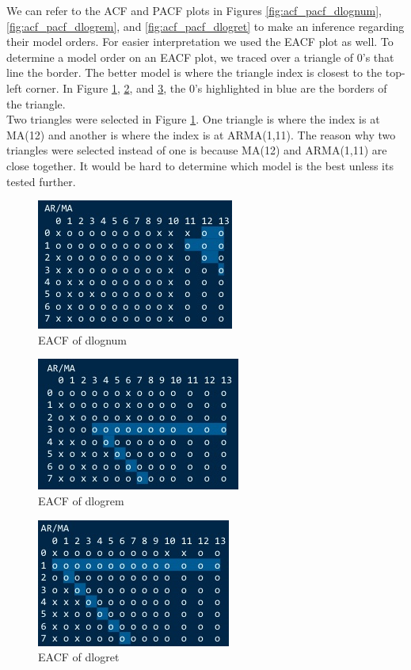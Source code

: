 \documentclass[a4paper]{article}
\begin{document}
We can refer to the ACF and PACF plots in Figures \ref{fig:acf_pacf_dlognum}, \ref{fig:acf_pacf_dlogrem}, and \ref{fig:acf_pacf_dlogret} to make an inference regarding their model orders. For easier interpretation we used the EACF plot as well. To determine a model order on an EACF plot, we traced over a triangle of 0's that line the border. The better model is where the triangle index is closest to the top-left corner. In Figure \ref{fig:eacf_num}, \ref{fig:eacf_rem}, and \ref{fig:eacf_ret}, the 0's highlighted in blue are the borders of the triangle. \\

Two triangles were selected in Figure \ref{fig:eacf_num}. One triangle is where the index is at MA(12) and another is where the index is at ARMA(1,11). The reason why two triangles were selected instead of one is because MA(12) and ARMA(1,11) are close together. It would be hard to determine which model is the best unless its tested further. \\

\begin{figure}[h!]
\centering
\includegraphics[scale=0.6]{images/eacf_num.jpg}
\caption{EACF of dlognum}
\label{fig:eacf_num}
\end{figure}

\begin{figure}[h!]
\centering
\includegraphics[scale=0.57]{images/eacf_rem.jpg}
\caption{EACF of dlogrem}
\label{fig:eacf_rem}
\end{figure}

\begin{figure}[h!]
\centering
\includegraphics[scale=0.6]{images/eacf_ret.jpg}
\caption{EACF of dlogret}
\label{fig:eacf_ret}
\end{figure}
\end{document}
